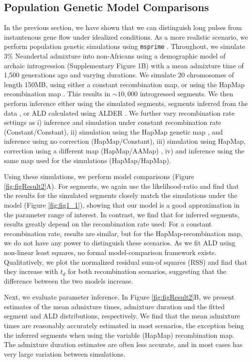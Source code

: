 \documentclass[11pt]{article}
\begin{document}
\subsection{Population Genetic Model Comparisons}\label{Model comparison}
In the previous section, we have shown that we can distinguish long pulses from instantenous gene flow under idealized conditions. As a more realistic scenario, we perform population genetic simulations using  \texttt{msprime}  \citep{kelleher_efficient_2016}. Throughout, we simulate 3\% Neandertal admixture into non-Africans using a demographic model of archaic introgression (Supplementary Figure 1B) with a mean admixture time of 1,500 generations ago and varying durations.  We simulate 20 chromosomes of length 150MB, using either a constant recombination map, or using the HapMap recombination map \citep{HapMapConsortium_second_2007}. This results in $\sim10,000$ introgressed segments. We then perform inference either using the simulated segments, segments inferred from the data \citep{skov_detecting_2018}, or ALD calculated using ALDER \citep{loh_inferring_2013}. We further vary recombination rate settings as i) inference and simulation under constant recombination rate (Constant/Constant), ii) simulation using the HapMap genetic map \citep{HapMapConsortium_second_2007}, and inference using no correction (HapMap/Constant), iii) simulation using HapMap, correction using a different map  (HapMap/AAMap) \citep{hinch_landscape_2011}, iv) and inference using the same map used for the simulations (HapMap/HapMap). 

Using these simulations, we perform  model comparisons (Figure \ref{fig:figResult2}A). For segments, we again use the likelihood-ratio and find that the results for the simulated segments closely match the simulations under the model (Figure \ref{fig:fig1_1}), showing that our model is a good approximation in the parameter range of interest. In contrast, we find that for inferred segments, results greatly depend on the recombination rate used: For a constant recombination rate, results are similar, but for the HapMap-recombination map, we do not have any power to distinguish these scenarios. As we fit ALD using non-linear least squares, no formal model-comparison framework exists. Qualitatively, we plot the normalized residual sum-of squares (RSS) and find that they increase with $t_d$ for both recombination scenarios, suggesting that the difference between the two models increase. 

Next, we evaluate parameter inference. In Figure \ref{fig:figResult2}B, we present estimates of the mean admixture times, admixture duration and the fitted segment and ALD distributions, respectively.  We find that the mean admixture times are reasonably accurately estimated in most scenarios, the exception being the inferred segments when using the variable (HapMap) recombination map. The admixture duration estimates are  often less accurate, and in most cases has very large variation between simulations.
 
\end{document}
